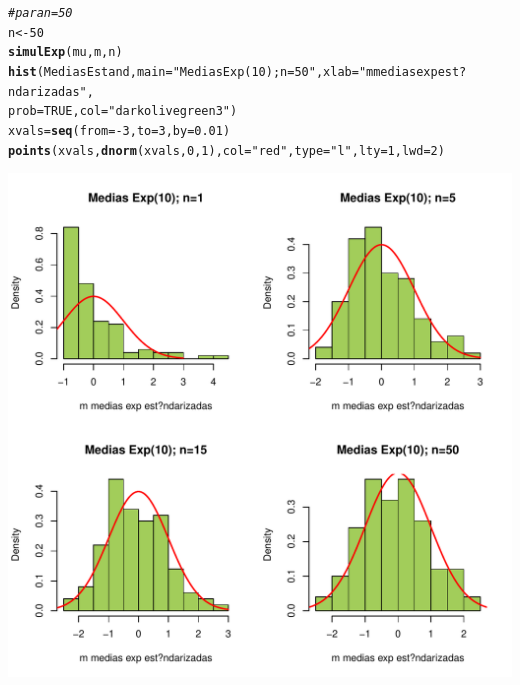\documentclass[10pt,a4paper]{article}\usepackage[]{graphicx}\usepackage[]{color}
\makeatletter
\def\maxwidth{ %
  \ifdim\Gin@nat@width>\linewidth
    \linewidth
  \else
    \Gin@nat@width
  \fi
}
\newcommand{\hlnum}[1]{\textcolor[rgb]{0.686,0.059,0.569}{#1}}%
\newcommand{\hlstr}[1]{\textcolor[rgb]{0.192,0.494,0.8}{#1}}%
\newcommand{\hlcom}[1]{\textcolor[rgb]{0.678,0.584,0.686}{\textit{#1}}}%
\newcommand{\hlopt}[1]{\textcolor[rgb]{0,0,0}{#1}}%
\newcommand{\hlstd}[1]{\textcolor[rgb]{0.345,0.345,0.345}{#1}}%
\newcommand{\hlkwb}[1]{\textcolor[rgb]{0.69,0.353,0.396}{#1}}%
\newcommand{\hlkwc}[1]{\textcolor[rgb]{0.333,0.667,0.333}{#1}}%
\newcommand{\hlkwd}[1]{\textcolor[rgb]{0.737,0.353,0.396}{\textbf{#1}}}%
\newenvironment{kframe}{%
 \def\at@end@of@kframe{}%
 \ifinner\ifhmode%
  \def\at@end@of@kframe{\end{minipage}}%
  \begin{minipage}{\columnwidth}%
 \fi\fi%
 \def\FrameCommand##1{\hskip\@totalleftmargin \hskip-\fboxsep
 \colorbox{shadecolor}{##1}\hskip-\fboxsep
     \hskip-\linewidth \hskip-\@totalleftmargin \hskip\columnwidth}%
 \MakeFramed {\advance\hsize-\width
   \@totalleftmargin\z@ \linewidth\hsize
   \@setminipage}}%
 {\par\unskip\endMakeFramed%
 \at@end@of@kframe}
\newenvironment{knitrout}{}{} %
\makeatother
\begin{document}
\begin{knitrout}
\begin{kframe}
\begin{alltt}
\hlcom{# para n=50 }
\hlstd{n} \hlkwb{<-} \hlnum{50}
\hlkwd{simulExp}\hlstd{(mu, m, n)}
\hlkwd{hist}\hlstd{(MediasEstand,} \hlkwc{main}\hlstd{=}\hlstr{"Medias Exp(10); n=50"}\hlstd{,} \hlkwc{xlab}\hlstd{=}\hlstr{"m medias exp est?ndarizadas"}\hlstd{,}
\hlkwc{prob}\hlstd{=}\hlnum{TRUE}\hlstd{,} \hlkwc{col}\hlstd{=}\hlstr{"darkolivegreen3"}\hlstd{)}
\hlstd{xvals} \hlkwb{=} \hlkwd{seq}\hlstd{(}\hlkwc{from}\hlstd{=}\hlopt{-}\hlnum{3}\hlstd{,} \hlkwc{to}\hlstd{=}\hlnum{3}\hlstd{,} \hlkwc{by}\hlstd{=}\hlnum{0.01}\hlstd{)}
\hlkwd{points}\hlstd{(xvals,} \hlkwd{dnorm}\hlstd{(xvals,} \hlnum{0}\hlstd{,} \hlnum{1}\hlstd{),} \hlkwc{col} \hlstd{=} \hlstr{"red"}\hlstd{,} \hlkwc{type}\hlstd{=}\hlstr{"l"}\hlstd{,} \hlkwc{lty}\hlstd{=}\hlnum{1}\hlstd{,} \hlkwc{lwd}\hlstd{=}\hlnum{2}\hlstd{)}
\end{alltt}
\end{kframe}
\includegraphics[width=\maxwidth]{figure/unnamed-chunk-2-3} 

\end{knitrout}
\end{document}
